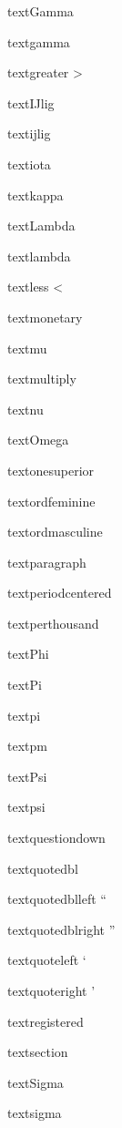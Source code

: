 \documentclass{article}
\begin{document}
textGamma    \textGamma{}

textgamma    \textgamma{}

textgreater    \textgreater{}

textIJlig    \textIJlig{}

textijlig    \textijlig{}

textiota    \textiota{}

textkappa    \textkappa{}

textLambda    \textLambda{}

textlambda    \textlambda{}

textless    \textless{}

textmonetary    \textmonetary{}

textmu    \textmu{}

textmultiply    \textmultiply{}

textnu    \textnu{}

textOmega    \textOmega{}

textonesuperior    \textonesuperior{}

textordfeminine    \textordfeminine{}

textordmasculine    \textordmasculine{}

textparagraph    \textparagraph{}

textperiodcentered    \textperiodcentered{}

textperthousand    \textperthousand{}

textPhi    \textPhi{}

textPi    \textPi{}

textpi    \textpi{}

textpm    \textpm{}

textPsi    \textPsi{}

textpsi    \textpsi{}

textquestiondown    \textquestiondown{}

textquotedbl    \textquotedbl{}

textquotedblleft    \textquotedblleft{}

textquotedblright    \textquotedblright{}

textquoteleft    \textquoteleft{}

textquoteright    \textquoteright{}

textregistered    \textregistered{}

textsection    \textsection{}

textSigma    \textSigma{}

textsigma    \textsigma{}
\end{document}
